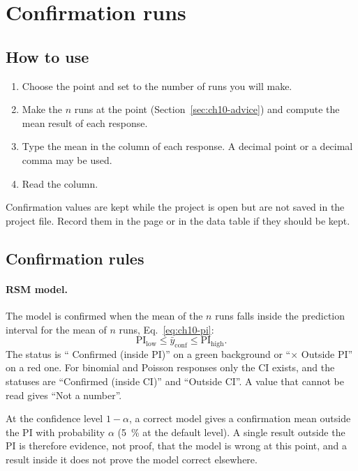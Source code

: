 \section{Confirmation runs}\label{sec:ch10-confirm}

\subsection{How to use}

\begin{enumerate}
  \item Choose the point and set  to the number of runs you will make.
  \item Make the $n$ runs at the point (Section~\ref{sec:ch10-advice}) and compute the mean result of each response.
  \item Type the mean in the  column of each response. A decimal point or a decimal comma may
    be used.
  \item Read the  column.
\end{enumerate}
Confirmation values are kept while the project is open but are not saved in the project file. Record them in the
 page or in the data table if they should be kept.

\subsection{Confirmation rules}

\paragraph{RSM model.} The model is confirmed when the mean of the $n$ runs falls inside the prediction interval
for the mean of $n$ runs, Eq.~\eqref{eq:ch10-pi}:
\begin{equation}
  \text{PI}_\text{low} \le \bar y_\text{conf} \le \text{PI}_\text{high}. \label{eq:ch10-rule-rsm}
\end{equation}
The status is ``\checkmark{} Confirmed (inside PI)'' on a green background or ``$\times$ Outside PI'' on a red one.
For binomial and Poisson responses only the CI exists, and the statuses are ``Confirmed (inside CI)'' and ``Outside
CI''. A value that cannot be read gives ``Not a number''.

At the confidence level $1-\alpha$, a correct model gives a confirmation mean outside the PI with probability
$\alpha$ (5~\% at the default level). A single result outside the PI is therefore evidence, not proof, that the model
is wrong at this point, and a result inside it does not prove the model correct elsewhere.

